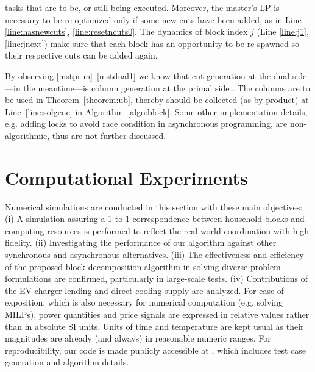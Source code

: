 \documentclass[journal]{IEEEtran}
\begin{document}
tasks that are to be, or still being executed.
Moreover, the master's LP is necessary to be re-optimized only if some new cuts have been added, as in Line \ref{line:hasnewcuts}, \ref{line:resetncuts0}.
The dynamics of block index $j$ (Line \ref{line:j1}, \ref{line:jnext}) make sure that each block has
an opportunity to be re-spawned so their respective cuts can be added again.
\par
By observing \eqref{mstprim}--\eqref{mstdual1} we know that cut generation at the dual side---in the meantime---is column generation at the primal side \cite{dw2019}. The columns are to be used in Theorem~\ref{theorem:ub}, thereby should be collected (as by-product) at Line~\ref{line:solgene} in Algorithm~\ref{algo:block}. Some other implementation details, e.g. adding locks to avoid race condition in asynchronous programming, are non-algorithmic, thus are not further discussed.

\section{Computational Experiments}\label{section:five}
Numerical simulations are conducted in this section with these main objectives:
(i) A simulation assuring a 1-to-1 correspondence between household blocks and computing resources
is performed to reflect the real-world coordination with high fidelity.
(ii) Investigating the performance of our algorithm against other synchronous and asynchronous alternatives.
(iii) The effectiveness and efficiency of the proposed block decomposition algorithm in 
solving diverse problem formulations are confirmed, particularly in large-scale tests.
(iv) Contributions of the EV charger lending and direct cooling supply are analyzed.
For ease of exposition, which is also necessary for numerical computation (e.g. solving MILPs),
power quantities and price signals are expressed in relative values rather than in absolute SI units.
Units of time and temperature are kept usual as their magnitudes are already (and always) in reasonable numeric ranges.
For reproducibility, our code is made publicly accessible at \cite{github2025},
which includes test case generation and algorithm details.
\end{document}
